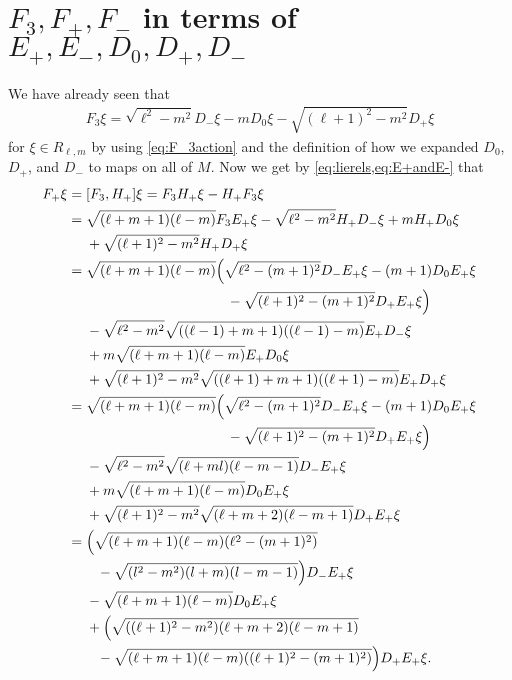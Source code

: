 \section{\texorpdfstring{$F_3,F_+,F_-$ in terms of $E_+,E_-,D_0,D_+,D_-$}{F\_3,F\_+,F\_- in terms of E\_+,E\_-,D\_0,D\_+,D\_-}}\label{sec:Factions}

We have already seen that
\begin{align*}
  F_3 \xi = \sqrt{\ell^2-m^2} D_- \xi - m D_0 \xi - \sqrt{(\ell+1)^2-m^2} D_+ \xi
\end{align*}
for $\xi\in R_{\ell,m}$ by using \cref{eq:F_3action} and the definition of how we expanded $D_0$, $D_+$, and $D_-$ to maps on all of $M$. Now we get by \cref{eq:lierels,eq:E+andE-} that
\begin{align*}
  F_+ \xi &= [F_3,H_+] \xi = F_3H_+ \xi - H_+F_3 \xi \\
          &= \sqrt{(\ell+m+1)(\ell-m)}F_3E_+ \xi - \sqrt{\ell^2-m^2} H_+D_- \xi + m H_+D_0 \xi \\*
          &\phantom{{}={}}{} + \sqrt{(\ell+1)^2-m^2} H_+D_+ \xi \\
          &= \sqrt{(\ell+m+1)(\ell-m)}\Bigl( \sqrt{\ell^2-(m+1)^2} D_-E_+ \xi - (m+1) D_0E_+ \xi \\*
          &\phantom{{}={}\sqrt{(\ell+m+1)(\ell-m)}()}{} - \sqrt{(\ell+1)^2-(m+1)^2} D_+E_+ \xi \Bigr) \\*
          &\phantom{{}={}}{} - \sqrt{\ell^2-m^2} \sqrt{((\ell-1)+m+1)((\ell-1)-m)} E_+D_- \xi \\*
          &\phantom{{}={}}{} + m \sqrt{(\ell+m+1)(\ell-m)}E_+D_0 \xi \\*
          &\phantom{{}={}}{} + \sqrt{(\ell+1)^2-m^2}\sqrt{((\ell+1)+m+1)((\ell+1)-m)} E_+D_+ \xi \\
          &= \sqrt{(\ell+m+1)(\ell-m)}\Bigl( \sqrt{\ell^2-(m+1)^2} D_-E_+ \xi - (m+1) D_0E_+ \xi \\*
          &\phantom{{}={}\sqrt{(\ell+m+1)(\ell-m)}()}{} - \sqrt{(\ell+1)^2-(m+1)^2} D_+E_+ \xi \Bigr) \\*
          &\phantom{{}={}}{} - \sqrt{\ell^2-m^2} \sqrt{(\ell+ml)(\ell-m-1)} D_-E_+ \xi \\*
          &\phantom{{}={}}{} + m \sqrt{(\ell+m+1)(\ell-m)}D_0E_+ \xi \\*
          &\phantom{{}={}}{} + \sqrt{(\ell+1)^2-m^2}\sqrt{(\ell+m+2)(\ell-m+1)} D_+E_+ \xi \\
          &= \Bigl( \sqrt{(\ell+m+1)(\ell-m)(\ell^2-(m+1)^2)} \\*
          &\phantom{{}={}()}{} - \sqrt{(l^2-m^2)(l+m)(l-m-1)} \Bigr)D_-E_+ \xi \\*
          &\phantom{{}={}}{} - \sqrt{(\ell+m+1)(\ell-m)}D_0E_+\xi \\*
          &\phantom{{}={}}{} + \Bigl( \sqrt{((\ell+1)^2-m^2)(\ell+m+2)(\ell-m+1)} \\*
          &\phantom{{}={}()}{} - \sqrt{(\ell+m+1)(\ell-m)((\ell+1)^2-(m+1)^2)}\Bigr)D_+E_+\xi.
\end{align*}

